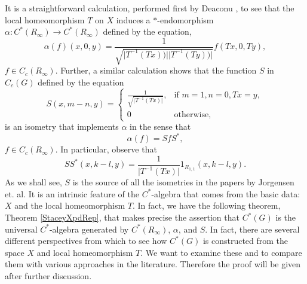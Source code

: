 \documentclass{amsproc}
\theoremstyle{plain}
\theoremstyle{definition}
\theoremstyle{definition}
\theoremstyle{remark}
\theoremstyle{plain}
\begin{document}
It is a straightforward calculation, performed first by Deaconu \cite{vD95},
to see that the local homeomorphism $T$ on $X$ induces a $*$-endomorphism
$\alpha:C^{\ast}(R_{\infty})\to C^{\ast}(R_{\infty})$ defined by
the equation,\begin{equation}
\alpha(f)(x,0,y)=\frac{1}{\sqrt{\vert T^{-1}(Tx))\vert\vert
T^{-1}(Ty))\vert}}f(Tx,0,Ty),\label{eq:alphainfty}\end{equation}
 $f\in C_{c}(R_{\infty})$. Further, a similar calculation shows that
the function $S$ in $C_{c}(G)$ defined by the equation\begin{equation}
S(x,m-n,y)=\begin{cases}
\frac{1}{\sqrt{\vert T^{-1}(Tx)\vert}}, & \mbox{if }m=1,n=0,Tx=y,\\
0 & \mbox{otherwise,}\end{cases}\label{eq:isometry}\end{equation}
 is an isometry that implements $\alpha$ in the sense that\begin{equation}
\alpha(f)=SfS^{\ast},\label{eq:Stacey1}\end{equation}
 $f\in C_{c}(R_{\infty})$. In particular, observe that\begin{equation}
SS^{*}(x,k-l,y)=\frac{1}{\vert
T^{-1}(Tx)\vert}1_{R_{1,1}}(x,k-l,y).\label{eq:Stacey2}\end{equation}
 As we shall see, $S$ is the source of all the isometries in the
papers by Jorgensen et. al. It is an intrinsic feature of the $C^{*}$-algebra
that comes from the basic data: $X$ and the local homeomorphism $T$.
In fact, we have the following theorem, Theorem \ref{StaceyXpdRep},
that makes precise the assertion that $C^{\ast}(G)$ is the universal
$C^{\ast}$-algebra generated by $C^{*}(R_{\infty})$, $\alpha$,
and $S$. In fact, there are several different perspectives from which
to see how $C^{*}(G)$ is constructed from the space $X$ and local
homeomorphism $T$. We want to examine these and to compare them with
various approaches in the literature. Therefore the proof will be
given after further discussion. 
\end{document}
